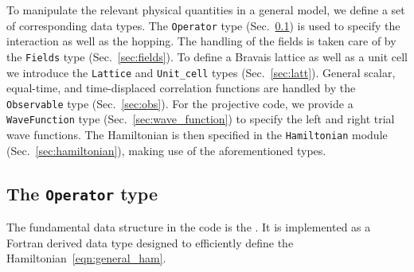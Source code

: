 



To manipulate the relevant physical quantities in a general model, we define a set of corresponding data types. The \texttt{Operator} type (Sec.~\ref{sec:op}) is used  to specify the interaction as well as the hopping.  The handling of the fields is taken care of by the \texttt{Fields} type (Sec.~\ref{sec:fields}). To define a Bravais lattice as well as a unit cell we introduce the \texttt{Lattice}  and \texttt{Unit\_cell} types (Sec.~\ref{sec:latt}).  General  scalar,  equal-time, and time-displaced correlation functions are  handled by the  \texttt{Observable} type (Sec.~\ref{sec:obs}).  For the projective code, we provide a \texttt{WaveFunction} type (Sec.~\ref{sec:wave_function}) to specify the left and right trial wave functions.  The Hamiltonian is then specified in the  \texttt{Hamiltonian}  module (Sec.~\ref{sec:hamiltonian}), making use of the aforementioned types. 



\subsection{The \texttt{Operator} type}\label{sec:op}

The fundamental data structure in the code is the . It is implemented as a Fortran derived data type designed to efficiently define the Hamiltonian~\eqref{eqn:general_ham}.

